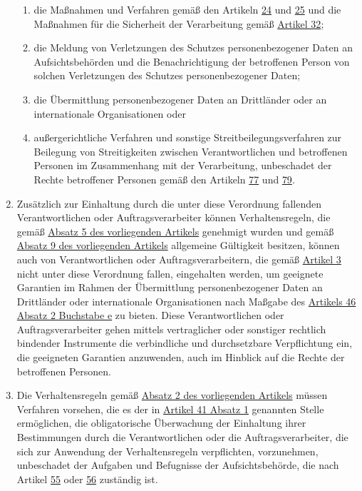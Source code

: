 \begin{enumerate}
\begin{enumerate}
    \item die Maßnahmen und Verfahren gemäß den Artikeln \hyperref[itm:]{24} und \hyperref[itm:]{25} und die Maßnahmen
     für die Sicherheit der Verarbeitung gemäß \hyperref[ch:32]{Artikel 32};
    \label{itm:40-2h}

    \item die Meldung von Verletzungen des Schutzes personenbezogener Daten an Aufsichtsbehörden und die
     Benachrichtigung der betroffenen Person von solchen Verletzungen des Schutzes personenbezogener Daten;
    \label{itm:40-2i}

    \item die Übermittlung personenbezogener Daten an Drittländer oder an internationale Organisationen oder
    \label{itm:40-2j}

    \item außergerichtliche Verfahren und sonstige Streitbeilegungsverfahren zur Beilegung von Streitigkeiten zwischen
     Verantwortlichen und betroffenen Personen im Zusammenhang mit der Verarbeitung, unbeschadet der Rechte betroffener
     Personen gemäß den Artikeln \hyperref[ch:77]{77} und \hyperref[ch:79]{79}.
    \label{itm:40-2k}

  \end{enumerate}

  \item Zusätzlich zur Einhaltung durch die unter diese Verordnung fallenden Verantwortlichen oder Auftragsverarbeiter
   können Verhaltensregeln, die gemäß \hyperref[itm:40-5]{Absatz 5 des vorliegenden Artikels} genehmigt wurden und
   gemäß \hyperref[itm:40-9]{Absatz 9 des vorliegenden Artikels} allgemeine Gültigkeit besitzen, können auch von
   Verantwortlichen oder Auftragsverarbeitern, die gemäß \hyperref[ch:03]{Artikel 3} nicht unter diese Verordnung
   fallen, eingehalten werden, um geeignete Garantien im Rahmen der Übermittlung personenbezogener Daten an Drittländer
   oder internationale Organisationen nach Maßgabe des \hyperref[itm:46-2e]{Artikels 46 Absatz 2 Buchstabe e} zu
   bieten. Diese Verantwortlichen oder Auftragsverarbeiter gehen mittels vertraglicher oder sonstiger rechtlich
   bindender Instrumente die verbindliche und durchsetzbare Verpflichtung ein, die geeigneten Garantien anzuwenden,
   auch im Hinblick auf die Rechte der betroffenen Personen.
  \label{itm:40-3}

  \item Die Verhaltensregeln gemäß \hyperref[itm:40-2]{Absatz 2 des vorliegenden Artikels} müssen Verfahren vorsehen,
   die es der in \hyperref[itm:41-2]{Artikel 41 Absatz 1} genannten Stelle ermöglichen, die obligatorische Überwachung
   der Einhaltung ihrer Bestimmungen durch die Verantwortlichen oder die Auftragsverarbeiter, die sich zur Anwendung
   der Verhaltensregeln verpflichten, vorzunehmen, unbeschadet der Aufgaben und Befugnisse der Aufsichtsbehörde, die
   nach Artikel \hyperref[ch:55]{55} oder \hyperref[ch:56]{56} zuständig ist.
  \label{itm:40-4}


\end{enumerate}
